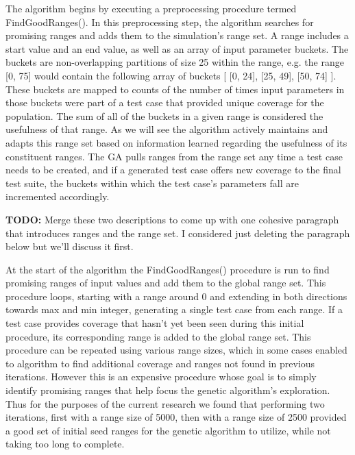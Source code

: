 \documentclass[runningheads]{llncs}
\begin{document}
The algorithm begins by executing a preprocessing procedure termed FindGoodRanges(). In this preprocessing step, the algorithm searches for promising ranges and adds them to the simulation's range set. A range includes a start value and an end value, as well as an array of input parameter buckets. The buckets are non-overlapping partitions of size 25 within the range, e.g. the range [0, 75] would contain the following array of buckets [ [0, 24], [25, 49], [50, 74] ]. These buckets are mapped to counts of the number of times input parameters in those buckets were part of a test case that provided unique coverage for the population. The sum of all of the buckets in a given range is considered the usefulness of that range. As we will see the algorithm actively maintains and adapts this range set based on information learned regarding the usefulness of its constituent ranges. The GA pulls ranges from the range set any time a test case needs to be created, and if a generated test case offers new coverage to the final test suite, the buckets within which the test case's parameters fall are incremented accordingly.

\textbf{TODO:} Merge these two descriptions to come up with one cohesive paragraph that introduces ranges and the range set. I considered just deleting the paragraph below but we'll discuss it first.

At the start of the algorithm the FindGoodRanges() procedure is run to find promising ranges of input values and add them to the global range set. This procedure loops, starting with a range around 0 and extending in both directions towards max and min integer, generating a single test case from each range. If a test case provides coverage that hasn't yet been seen during this initial procedure, its corresponding range is added to the global range set. This procedure can be repeated using various range sizes, which in some cases enabled to algorithm to find additional coverage and ranges not found in previous iterations. However this is an expensive procedure whose goal is to simply identify promising ranges that help focus the genetic algorithm's exploration. Thus for the purposes of the current research we found that performing two iterations, first with a range size of 5000, then with a range size of 2500 provided a good set of initial seed ranges for the genetic algorithm to utilize, while not taking too long to complete.
\end{document}
